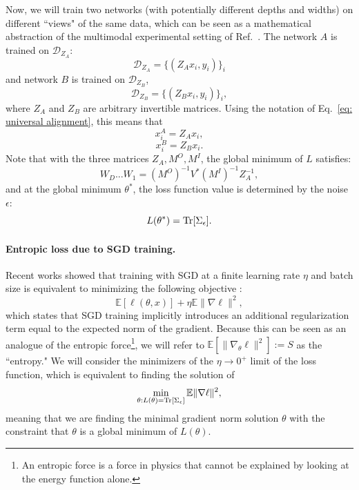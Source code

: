 \documentclass[11pt]{article}
\theoremstyle{plain}
\newcommand{\E}{\mathbb{E}}
\newcommand{\Tr}{{\rm Tr}}
\begin{document}
Now, we will train two networks (with potentially different depths and widths) on different ``views" of the same data, which can be seen as a mathematical abstraction of the multimodal experimental setting of Ref.~\cite{huh2024platonic}. The network $A$ is trained on $\mathcal{D}_{Z_A}$:
\begin{equation}
    \mathcal{D}_{Z_A} = \{(Z_A x_i, y_i)\}_i
\end{equation}
and network $B$ is trained on $\mathcal{D}_{Z_B}$,
\begin{equation}
    \mathcal{D}_{Z_B} = \{(Z_B x_i, y_i)\}_i,
\end{equation}
where $Z_A$ and $Z_B$ are arbitrary invertible matrices. Using the notation of Eq.~\eqref{eq: universal alignment}, this means that 
\begin{equation}
    x_i^A  = Z_A x_i,
\end{equation}
\begin{equation}
    x_i^B  = Z_B x_i.
\end{equation}
Note that with the three matrices $Z_A, M^O, M^I$, the global minimum of $L$ satisfies:
\begin{equation}
    W_D...W_1 = (M^O)^{-1} V^* (M^I)^{-1} Z_A^{-1},
\end{equation}
and at the global minimum $\theta^*$, the loss function value is determined by the noise $\epsilon$:
\begin{equation}
    L(\theta^*) = \Tr[\Sigma_\epsilon].
\end{equation}


\paragraph{Entropic loss due to SGD training.} Recent works showed that training with SGD at a finite learning rate $\eta$ and batch size is equivalent to minimizing the following objective \cite{barrett2020implicit, smith2021origin, ziyin2025neural}:%
\begin{equation}\label{eq: entropic loss}
     \E[\ell(\theta, x)] + \eta {\E \|\nabla\ell\|^2},
\end{equation}
which states that SGD training implicitly introduces an additional regularization term equal to the expected norm of the gradient. Because this can be seen as an analogue of the entropic force\footnote{An entropic force is a force in physics that cannot be explained by looking at the energy function alone.}, we will refer to $\E[\|\nabla_\theta\ell\|^2]:= S$ as the ``entropy." We will consider the minimizers of the $\eta \to 0^+$ limit of the loss function, which is equivalent to finding the solution of 
\begin{equation}
    \min_{\theta: L(\theta) =\Tr[\Sigma_\epsilon]} {\E \|\nabla\ell\|^2},
\end{equation}
meaning that we are finding the minimal gradient norm solution $\theta$ with the constraint that $\theta$ is a global minimum of $L(\theta)$.
\end{document}
